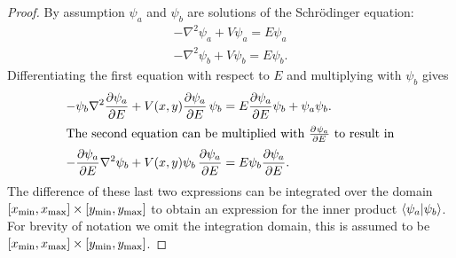 \begin{proof}
  By assumption $\psi_a$ and $\psi_b$ are solutions of the Schrödinger equation:
  \begin{align*}
    -\nabla^2 \psi_a + V \psi_a = E \psi_a \\
    -\nabla^2 \psi_b + V \psi_b = E \psi_b \text{.}
  \end{align*}
  Differentiating the first equation with respect to $E$ and multiplying with $\psi_b$ gives
  \begin{align*}
    - \psi_b \nabla^2\pdv{\psi_a}{E} + V(x, y)\pdv{\psi_a}{E} \, \psi_b & = E \pdv{\psi_a}{E}\psi_b + \psi_a\psi_b \text{.} \\
    \intertext{The second equation can be multiplied with $ \pdv[]{\psi_a}{E}$ to result in}
    -\pdv{\psi_a}{E} \nabla^2\psi_b  + V(x, y)\psi_b\,\pdv{\psi_a}{E}   & = E \psi_b\pdv{\psi_a}{E} \text{.}
  \end{align*}
  The difference of these last two expressions can be integrated over the domain $[{x_{\text{min}}}, {x_{\text{max}}}]\times[{y_{\text{min}}}, {y_{\text{max}}}]$ to obtain an expression for the inner product $\bra{\psi_a}\ket{\psi_b}$. For brevity of notation we omit the integration domain, this is assumed to be $[{x_{\text{min}}}, {x_{\text{max}}}] \times [{y_{\text{min}}}, {y_{\text{max}}}]$.


\end{proof}
